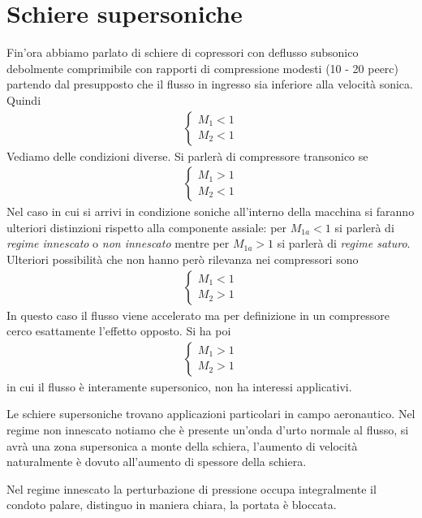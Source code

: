 \section{Schiere supersoniche}
Fin'ora abbiamo parlato di schiere di copressori con deflusso subsonico debolmente comprimibile con rapporti di compressione modesti (10 - 20 peerc) partendo dal presupposto che il flusso in ingresso sia inferiore alla velocità sonica. Quindi 
\begin{align*}
\begin{cases}
M_1 <1\\
M_2 <1
\end{cases}
\end{align*} 
Vediamo delle condizioni diverse. Si parlerà di compressore transonico se 
\begin{align*}
\begin{cases}
M_1 >1\\
M_2 <1
\end{cases}
\end{align*} 
Nel caso in cui si arrivi in condizione soniche all'interno della macchina si faranno ulteriori distinzioni rispetto alla componente assiale: per $M_{1a} < 1 $ si parlerà di \textit{regime innescato} o \textit{non innescato} mentre per $ M_{1a} > 1 $ si parlerà di \textit{regime saturo}.
Ulteriori possibilità che non hanno però rilevanza nei compressori sono 
\begin{align*}
\begin{cases}
M_1 <1\\
M_2 >1
\end{cases}
\end{align*} 
In questo caso il flusso viene accelerato ma per definizione in un compressore cerco esattamente l'effetto opposto. Si ha poi
\begin{align*}
\begin{cases}
M_1 >1\\
M_2 >1
\end{cases}
\end{align*} 
in cui il flusso è interamente supersonico, non ha interessi applicativi.

Le schiere supersoniche trovano applicazioni particolari in campo aeronautico. Nel regime non innescato notiamo che è presente un'onda d'urto normale al flusso, si avrà una zona supersonica a monte della schiera, l'aumento di velocità naturalmente è dovuto all'aumento di spessore della schiera.

Nel regime innescato la perturbazione di pressione occupa integralmente il condoto palare, distinguo in maniera chiara, la portata è bloccata. 

